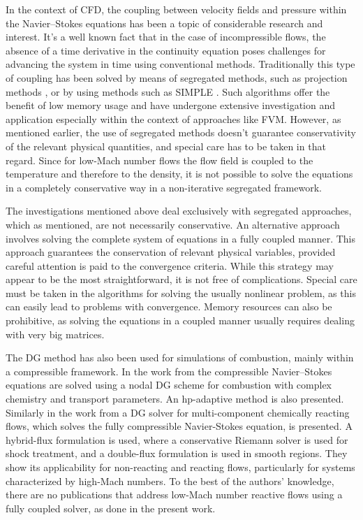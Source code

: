 In the context of \Gls{CFD}, the coupling between velocity fields and pressure within the Navier--Stokes equations has been a topic of considerable research and interest. It's a well known fact that in the case of incompressible flows, the absence of a time derivative in the continuity equation poses challenges for advancing the system in time using conventional methods. Traditionally this type of coupling has been solved by means of segregated methods, such as projection methods \parencite{chorinNumericalSolutionNavierStokes1967}, or by using methods such as SIMPLE \parencite{patankarNumericalHeatTransfer1980}. Such algorithms offer the benefit of low memory usage and have undergone extensive investigation and application especially within the context of approaches like \gls{FVM}. However, as mentioned earlier, the use of segregated methods doesn't guarantee conservativity of the relevant physical quantities, and special care has to be taken in that regard. Since for low-Mach number flows the flow field is coupled to the temperature and therefore to the density, it is not possible to solve the equations in a completely conservative way in a non-iterative segregated framework. 

The investigations mentioned above deal exclusively with segregated approaches, which as mentioned, are not necessarily conservative. An alternative approach involves solving the complete system of equations in a fully coupled manner. This approach guarantees the conservation of relevant physical variables, provided careful attention is paid to the convergence criteria.  While this strategy may appear to be the most straightforward, it is not free of complications. Special care must be taken in the algorithms for solving the usually nonlinear problem, as this can easily lead to problems with convergence. Memory resources can also be prohibitive, as solving the equations in a coupled manner usually requires dealing with very big matrices.  

The DG method has also been used for simulations of combustion, mainly within a compressible framework. In the work from \textcite{johnsonConservativeDiscontinuousGalerkin2020} the compressible Navier--Stokes equations are solved using a nodal DG scheme for combustion with complex chemistry and transport parameters. An hp-adaptive method is also presented. Similarly in the work from \textcite{lvHighorderDiscontinuousGalerkin2017} a DG solver for multi-component chemically reacting flows, which solves the fully compressible Navier-Stokes equation, is presented. A hybrid-flux formulation is used, where a conservative Riemann solver is used for shock treatment, and a double-flux formulation is used in smooth regions. They show its applicability for non-reacting and reacting flows, particularly for systems characterized by high-Mach numbers. To the best of the authors' knowledge, there are no publications that address low-Mach number reactive flows using a fully coupled solver, as done in the present work.

